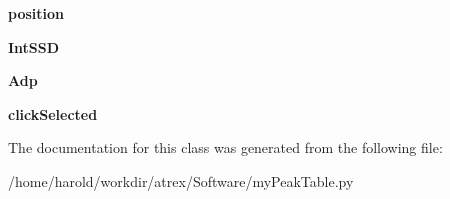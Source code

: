\begin{DoxyCompactItemize}
\item 
\hypertarget{classmyPeakTable_1_1myPeak_a14e93826d7c0fa3bce77caa61002d545}{{\bfseries position}}\label{classmyPeakTable_1_1myPeak_a14e93826d7c0fa3bce77caa61002d545}

\item 
\hypertarget{classmyPeakTable_1_1myPeak_adc16c2a4085ac1d6c9f9b8332e964be1}{{\bfseries Int\-S\-S\-D}}\label{classmyPeakTable_1_1myPeak_adc16c2a4085ac1d6c9f9b8332e964be1}

\item 
\hypertarget{classmyPeakTable_1_1myPeak_a1ad3ef21887f7a8d2c5f55df901476bc}{{\bfseries Adp}}\label{classmyPeakTable_1_1myPeak_a1ad3ef21887f7a8d2c5f55df901476bc}

\item 
\hypertarget{classmyPeakTable_1_1myPeak_ab95d78c678d003d9ff47a47fcccf9bb2}{{\bfseries click\-Selected}}\label{classmyPeakTable_1_1myPeak_ab95d78c678d003d9ff47a47fcccf9bb2}

\end{DoxyCompactItemize}


The documentation for this class was generated from the following file\-:\begin{DoxyCompactItemize}
\item 
/home/harold/workdir/atrex/\-Software/my\-Peak\-Table.\-py\end{DoxyCompactItemize}

